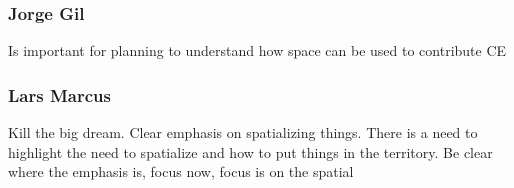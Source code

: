 \subsubsection{Jorge Gil}
Is important for planning to understand how space can be used to contribute CE


\subsubsection{Lars Marcus}
Kill the big dream. Clear emphasis on spatializing things. There is a need to highlight the need to spatialize and how to put things in the territory.
Be clear where the emphasis is, focus now, focus is on the spatial



















